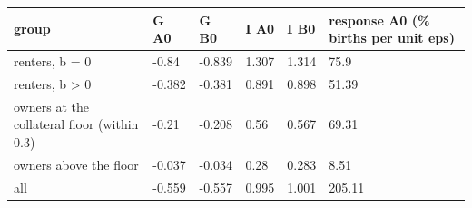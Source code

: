 \begingroup\small
\setlength{\tabcolsep}{3pt}
\renewcommand{\arraystretch}{1.04}
\begin{tabularx}{\linewidth}{XXXXXX}
\toprule
group & G A0 & G B0 & I A0 & I B0 & response A0 (\% births per unit eps) \\
\midrule
renters, b = 0 & -0.84 & -0.839 & 1.307 & 1.314 & 75.9 \\
renters, b \textgreater{} 0 & -0.382 & -0.381 & 0.891 & 0.898 & 51.39 \\
owners at the collateral floor (within 0.3) & -0.21 & -0.208 & 0.56 & 0.567 & 69.31 \\
owners above the floor & -0.037 & -0.034 & 0.28 & 0.283 & 8.51 \\
all & -0.559 & -0.557 & 0.995 & 1.001 & 205.11 \\
\bottomrule
\end{tabularx}
\endgroup
